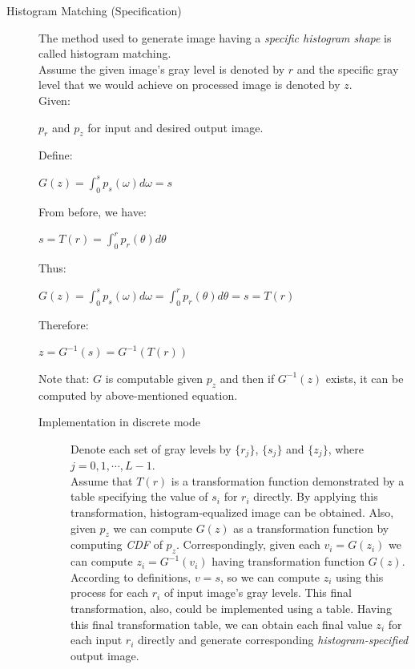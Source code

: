 \documentclass{article}
\begin{document}
\begin{description}
\item [Histogram Matching (Specification)] The method used to generate image having a \textit{specific histogram shape} is called histogram matching.\\
Assume the given image's gray level is denoted by $r$ and the specific gray level that we would achieve on processed image is denoted by $z$.\\
	Given:
	\begin{center}
	$p_r$ and $p_z$ for input and desired output image.
	\end{center}
	Define:
	\begin{center}
	$G(z) = \int_0^s p_s(\omega) d\omega = s$
	\end{center}
	From before, we have:
	\begin{center}
	$s = T(r) = \int_0^r p_r(\theta) d\theta$
	\end{center}
	Thus:
	\begin{center}
	$G(z) = \int_0^s p_s(\omega) d\omega  = \int_0^r p_r(\theta) d\theta = s = T(r)$
	\end{center}
	Therefore:
	\begin{center}
	$z = G^{-1}(s) = G^{-1}(T(r))$
	\end{center}
	Note that: $G$ is computable given $p_z$ and then if $G^{-1}(z)$ exists, it can be computed by above-mentioned equation.
	\begin{description}
	\item [Implementation in discrete mode] Denote each set of gray levels by $\{r_j\}$, $\{s_j\}$ and $\{z_j\}$, where $j = 0, 1,\cdots, L-1$.\\
	Assume that $T(r)$ is a transformation function demonstrated by a table specifying the value of $s_i$ for $r_i$ directly. By applying this transformation, histogram-equalized image can be obtained. Also, given $p_z$ we can compute $G(z)$ as a transformation function by computing \textit{CDF} of $p_z$. Correspondingly, given each $v_i = G(z_i)$ we can compute $z_i = G^{-1}(v_i)$ having transformation function $G(z)$. According to definitions, $v = s$, so we can compute $z_i$ using this process for each $r_i$ of input image's gray levels. This final transformation, also, could be implemented using a table. Having this final transformation table, we can obtain each final value $z_i$ for each input $r_i$ directly and generate corresponding \textit{histogram-specified} output image.
	\end{description}
\end{description}
\end{document}

